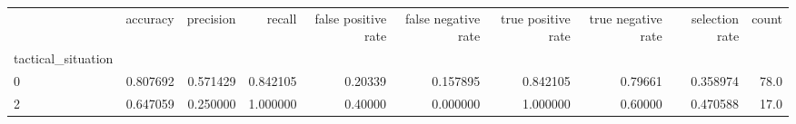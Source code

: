 \begin{tabular}{lrrrrrrrrr}
\toprule
{} &  accuracy &  precision &    recall &  false positive rate &  false negative rate &  true positive rate &  true negative rate &  selection rate &  count \\
tactical\_situation &           &            &           &                      &                      &                     &                     &                 &        \\
\midrule
0                  &  0.807692 &   0.571429 &  0.842105 &              0.20339 &             0.157895 &            0.842105 &             0.79661 &        0.358974 &   78.0 \\
2                  &  0.647059 &   0.250000 &  1.000000 &              0.40000 &             0.000000 &            1.000000 &             0.60000 &        0.470588 &   17.0 \\
\bottomrule
\end{tabular}
